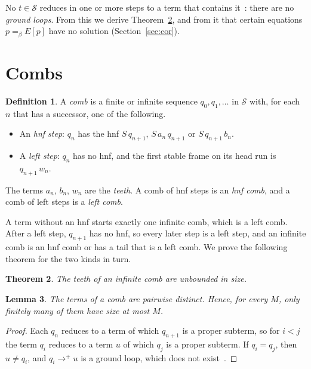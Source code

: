 \documentclass[11pt]{amsart}
\newtheorem{theorem}{Theorem}
\newtheorem{lemma}[theorem]{Lemma}
\theoremstyle{definition}
\newtheorem{definition}[theorem]{Definition}
\newcommand{\Ter}{\mathcal S}
\newcommand{\conv}{=_\beta}
\begin{document}
No $t\in\Ter$ reduces in one or more steps to a term that contains
it~\citep{waldmann-ic,s7}: there are no \emph{ground loops}. From this we derive
Theorem~\ref{thm:comb}, and from it that certain equations $p\conv E[p]$ have no solution
(Section~\ref{sec:cor}).

\section{Combs}\label{sec:comb}

\begin{definition}\label{def:comb}
A \emph{comb} is a finite or infinite sequence $q_0,q_1,\dots$ in $\Ter$ with, for each $n$ that has a successor, one of the following.
\begin{itemize}
\item An \emph{hnf step}: $q_n$ has the hnf $S\,q_{n+1}$, $S\,a_n\,q_{n+1}$ or $S\,q_{n+1}\,b_n$.
\item A \emph{left step}: $q_n$ has no hnf, and the first stable frame on its head run is
  $q_{n+1}\,w_n$.
\end{itemize}
The terms $a_n$, $b_n$, $w_n$ are the \emph{teeth}. A comb of hnf steps is an \emph{hnf comb}, and a comb of left steps is a \emph{left comb}.
\end{definition}

A term without an hnf starts exactly one infinite comb, which is a left comb. After a left step, $q_{n+1}$ has no hnf, so every later step is a left step, and an infinite comb is an hnf comb or has a tail that is a left comb. We prove the following theorem for the two kinds in turn.

\begin{theorem}\label{thm:comb}
The teeth of an infinite comb are unbounded in size.
\end{theorem}

\begin{lemma}\label{lem:distinct}
The terms of a comb are pairwise distinct. Hence, for every $M$, only finitely many of them have
size at most $M$.
\end{lemma}

\begin{proof}
Each $q_n$ reduces to a term of which $q_{n+1}$ is a proper subterm, so for $i<j$ the term $q_i$
reduces to a term $u$ of which $q_j$ is a proper subterm. If $q_i=q_j$, then $u\ne q_i$, and
$q_i\to^+u$ is a ground loop, which does not exist~\citep{s7}.
\end{proof}
\end{document}
